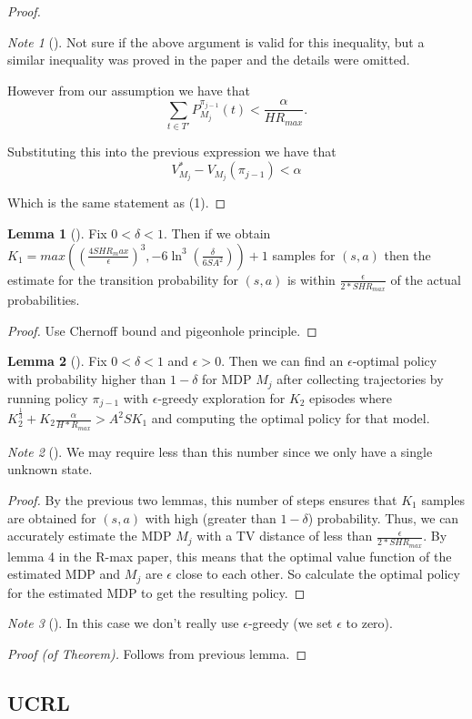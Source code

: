 \documentclass[12pt, letterpaper]{article}
\theoremstyle{definition}
\newtheorem*{lemma}{Lemma}
\theoremstyle{remark}
\newtheorem*{note}{Note}
\begin{document}
\begin{proof}[Proof]
    \begin{note}[]
        \color{red}
        Not sure if the above argument is valid for this inequality, but a similar inequality was proved in the paper and the details were omitted.
    \end{note}
    
    However from our assumption we have that 
    \[\sum_{t \in T'} P_{M_j}^{\pi_{j-1}}(t) < \frac{\alpha}{H R_{max}}.\]

    Substituting this into the previous expression we have that
    \[V^*_{M_j} - V_{M_j}(\pi_{j-1}) < \alpha\]
    
    Which is the same statement as (1).
\end{proof}

\begin{lemma}[]
    Fix \(0 < \delta < 1\). Then if we obtain \(K_1 = max((\frac{4SHR_max}{\epsilon})^3, -6\ln^3(\frac{\delta}{6SA^2})) + 1\) samples for \((s, a)\) then the estimate for the transition probability for \((s, a)\) is within \(\frac{\epsilon}{2*SHR_{max}}\) of the actual probabilities.
\end{lemma}

\begin{proof}[Proof]
    Use Chernoff bound and pigeonhole principle.
\end{proof}

\begin{lemma}[]
    Fix \(0 < \delta < 1\) and \(\epsilon > 0\). Then we can find an \(\epsilon\)-optimal policy with probability higher than \(1-\delta\) for MDP \(M_j\) after collecting trajectories by running policy \(\pi_{j-1}\) with \(\epsilon\)-greedy exploration for \(K_2\) episodes where \(K_2^{\frac{1}{3}} + K_2 \frac{\alpha}{H*R_{max}} > A^2 S K_1\) and computing the optimal policy for that model.
\end{lemma}

\begin{note}[]
    \color{red}
    We may require less than this number since we only have a single unknown state.
\end{note}

\begin{proof}[Proof]
    By the previous two lemmas, this number of steps ensures that \(K_1\) samples are obtained for \((s, a)\) with high (greater than \(1-\delta\)) probability. Thus, we can accurately estimate the MDP \(M_j\) with a TV distance of less than \(\frac{\epsilon}{2*SHR_{max}}\). By lemma 4 in the R-max paper, this means that the optimal value function of the estimated MDP and \(M_j\) are \(\epsilon\) close to each other. So calculate the optimal policy for the estimated MDP to get the resulting policy.
\end{proof}

\begin{note}[]
    \color{red}
    In this case we don't really use \(\epsilon\)-greedy (we set \(\epsilon\) to zero).
\end{note}

\begin{proof}[Proof (of Theorem)]
    Follows from previous lemma.
\end{proof}

\subsection{UCRL}
\end{document}
